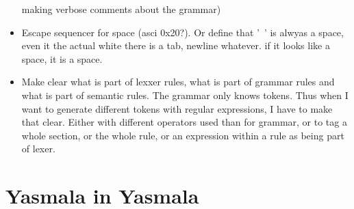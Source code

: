 \documentclass[a4paper]{report}
\begin{document}
\begin{itemize}
      making verbose comments about the grammar)      
\item Escape sequencer for space (asci 0x20?). Or define that '\ ' is alwyas
  a space, even it the actual white there is a tab, newline whatever. if it  looks like a space, it is a space.
\item Make clear what is part of lexxer rules, what is part of grammar rules
      and what is part of semantic rules. The grammar only knows tokens. Thus
      when I want to generate different tokens with regular expressions, I
      have to make that clear. Either with different operators used than for
      grammar, or to tag a whole section, or the whole rule, or an expression
      within a rule as being part of lexer.
\end{itemize}

\chapter{Yasmala in Yasmala}
\end{document}
